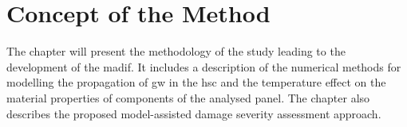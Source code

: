 
\chapter[Concept of the Method]{Concept of the Method}
\label{ch:method}

The chapter will present the methodology of the study leading to the development of the \ac{madif}.
It includes a description of the numerical methods for modelling the propagation of \ac{gw} in the \ac{hsc} and the temperature effect on the material properties of components of the analysed panel.
The chapter also describes the proposed model-assisted damage severity assessment approach.




%

